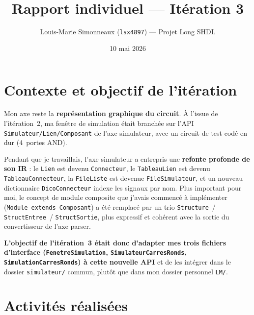 \documentclass[11pt,a4paper]{article}
\title{\vspace{-1.5cm}Rapport individuel --- It\'eration 3}
\author{Louis-Marie Simonneaux (\texttt{lsx4897}) --- Projet Long SHDL}
\date{10 mai 2026}
\begin{document}
\maketitle
\vspace{-1.5em}

\section*{Contexte et objectif de l'it\'eration}

Mon axe reste la \textbf{repr\'esentation graphique du circuit}. \`A l'issue de l'it\'eration~2, ma fen\^etre de simulation \'etait branch\'ee sur l'API \texttt{Simulateur/Lien/Composant} de l'axe simulateur, avec un circuit de test cod\'e en dur (4~portes AND).

Pendant que je travaillais, l'axe simulateur a entrepris une \textbf{refonte profonde de son IR} : le \texttt{Lien} est devenu \texttt{Connecteur}, le \texttt{TableauLien} est devenu \texttt{TableauConnecteur}, la \texttt{FileListe} est devenue \texttt{FileSimulateur}, et un nouveau dictionnaire \texttt{DicoConnecteur} indexe les signaux par nom. Plus important pour moi, le concept de \og module composite \fg{} que j'avais commenc\'e \`a impl\'ementer (\texttt{Module extends Composant}) a \'et\'e remplac\'e par un trio \texttt{Structure}~/ \texttt{StructEntree}~/ \texttt{StructSortie}, plus expressif et coh\'erent avec la sortie du convertisseur de l'axe parser.

\textbf{L'objectif de l'it\'eration~3 \'etait donc d'adapter mes trois fichiers d'interface (\texttt{FenetreSimulation}, \texttt{SimulateurCarresRonds}, \texttt{SimulationCarresRonds}) \`a cette nouvelle API} et de les int\'egrer dans le dossier \texttt{simulateur/} commun, plut\^ot que dans mon dossier personnel \texttt{LM/}.

\section*{Activit\'es r\'ealis\'ees}
\end{document}
